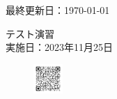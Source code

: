 \documentclass[a4paper,11pt]{jsarticle}
\begin{document}
\begin{titlepage}
  \hfill {最終更新日：\today}
  \begin{center}
    {\Huge\gt テスト演習}\\ \vspace{\baselineskip}
    \textup{\large 実施日：2023年11月25日}\\ 
  \end{center}
  \vfill
  \begin{figure}[H]
    \includegraphics[width=0.1\textwidth]{../graphs/qrcode.png}
  \end{figure}
\end{titlepage}

\qPart


\qPart


\qPart

\calcPage



\brankPage
\end{document}
